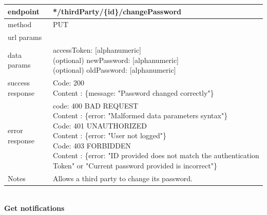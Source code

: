 \begin{legal}
\begin{legal}
\begin{itemize}
							\begin{tabularx}{\linewidth}{| l| l }
								\hline
								endpoint & */thirdParty/\{id\}/changePassword \\
								\hline
								method & PUT \\
								\hline
								url params & \\
								\hline
								data params & 
								\parbox{0.7\textwidth}{
									\bigskip
									accessToken: [alphanumeric] \\
									(optional) newPassword: [alphanumeric]\\
									(optional) oldPassword:
									[alphanumeric]\\
									\bigskip
								} \\
								\hline
								success response &
								\parbox{0.7\textwidth}{
									\bigskip
									Code: 200\\
									Content : \{message: "Password changed correctly"\}
									\bigskip
								} \\
								\hline
								error response &
								\parbox{0.7\textwidth}{
									\bigskip
									code: 400 BAD REQUEST \\
									Content : \{error: "Malformed data parameters syntax"\}\\
									Code: 401 UNAUTHORIZED \\
									Content : \{error: "User not logged"\}\\
									Code: 403 FORBIDDEN \\
									Content : \{error: "ID provided does not match the authentication Token" or  "Current password provided is incorrect"\}\\
									\bigskip
								} \\
								\hline
								Notes & \parbox{0.7\textwidth}{
									\bigskip
									Allows a third party to change its password.
									\bigskip
								} \\
								\hline
							\end{tabularx}\\
							\newpage
							\textbf{Get notifications} \\
			

\end{itemize}
\end{legal}
\end{legal}
